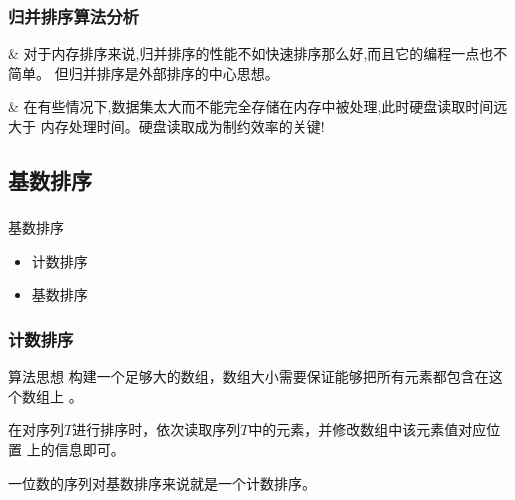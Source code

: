 \begin{frame}[fragile]
  \frametitle{归并排序算法分析}
  \begin{easylist} \easyitem

    & 对于内存排序来说,归并排序的性能不如快速排序那么好,而且它的编程一点也不简单。
    但归并排序是外部排序的中心思想。

    & 在有些情况下,数据集太大而不能完全存储在内存中被处理,此时硬盘读取时间远大于
    内存处理时间。硬盘读取成为制约效率的关键!
  \end{easylist}
\end{frame}

\subsection{基数排序}

\begin{frame}[fragile]
  \frametitle{}
  \begin{sectionbox}{基数排序}
    \begin{itemize}
    \item 计数排序
    \item 基数排序
    \end{itemize}
  \end{sectionbox}
\end{frame}

\begin{frame}[fragile]
  \frametitle{计数排序}
  \begin{infobox}{算法思想}
    构建一个足够大的数组，数组大小需要保证能够把所有元素都包含在这个数组上 。

    在对序列$T$进行排序时，依次读取序列$T$中的元素，并修改数组中该元素值对应位置
    上的信息即可。

    一位数的序列对基数排序来说就是一个计数排序。
  \end{infobox}  
\end{frame}

